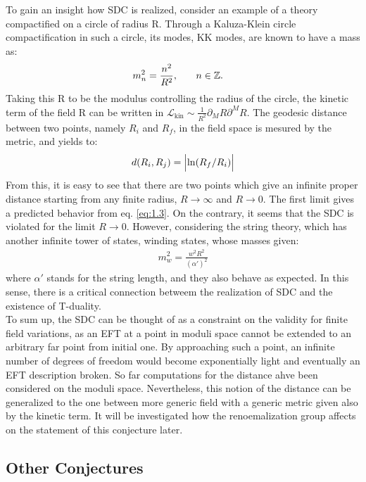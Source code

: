 \indent To gain an insight how SDC is realized, consider an example of a theory compactified on a circle of radius R. Through a Kaluza-Klein circle compactification in such a circle, its modes, KK modes, are known to have a mass as:
\begin{align}
    \label{eq:1.3}
    m_{n}^{2} = \frac{n^{2}}{R^{2}} ,& \qq{} n \in \mathbb{Z}. 
\end{align}
Taking this R to be the modulus controlling the radius of the circle, the kinetic term of the field R can be written in $\mathcal{L} _\text{{kin}} \sim \frac{1}{R^{2}} \partial_{M} R \partial ^{M} R$. The geodesic distance between two points, namely $R_{i}$ and $R_{f}$, in the field space is mesured by the metric, and yields to:
\begin{align}
    d(R_{i},R_{j}) = \abs \Big{\ln (R_{f} / R_{i})}
\end{align} 
From this, it is easy to see that there are two points which give an infinite proper distance starting from any finite radius, $R \to \infty$ and $R \to 0 $. The first limit gives a predicted behavior from eq. \ref{eq:1.3}. On the contrary, it seems that the SDC is violated for the limit $R \to 0$. However, considering the string theory, which has another infinite tower of states, winding states, whose masses given:
\begin{align}
    \label{eq:1.5}
    m_{w} ^2 = \frac{w^{2} R^{2}}{(\alpha ')^2}
\end{align}
where $\alpha '$ stands for the string length, and they also behave as expected. In this sense, there is a critical connection betweem the realization of SDC and the existence of T-duality. \\
\indent To sum up, the SDC can be thought of as a constraint on the validity for finite field variations, as an EFT at a point in moduli space cannot be extended to an arbitrary far point from initial one. By approaching such a point, an infinite number of degrees of freedom would become exponentially light and eventually an EFT description broken. So far computations for the distance ahve been considered on the moduli space. Nevertheless, this notion of the distance can be generalized to the one between more generic field with a generic metric given also by the kinetic term. It will be investigated how the renoemalization group affects on the statement of this conjecture later. 
\subsection{Other Conjectures}
